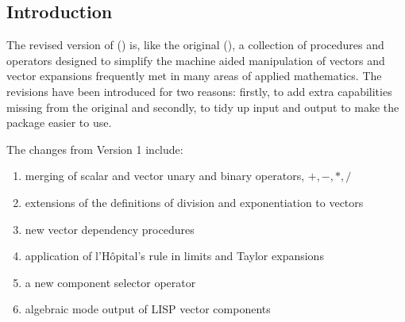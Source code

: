 
\subsection{Introduction}
The revised version of  (\cite{Eastwood:91}) is, like the
original (\cite{Eastwood:87}), a collection of \REDUCE procedures and
operators designed to simplify the machine aided manipulation of vectors
and vector expansions frequently met in many areas of applied mathematics.
The revisions have been introduced for two reasons: firstly, to add extra
capabilities missing from the original and secondly, to tidy up input and
output to make the package easier to use.

The changes from Version 1 include:
\begin{enumerate}
\item merging of scalar and vector unary and binary operators, $+, - , *, /
$
\item extensions of the definitions of division and exponentiation 
to vectors
\item new vector dependency procedures
\item application of l'H\^opital's rule in limits and Taylor expansions
\item a new component selector operator
\item algebraic mode output of LISP vector components
\end{enumerate}

